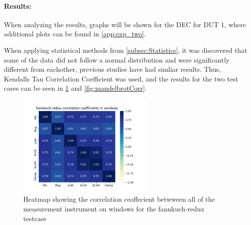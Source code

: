 

\paragraph{Results:} When analyzing the results, graphs will be shown for the DEC for DUT 1, where additional plots can be found in \cref{app:exp_two}.




When applying statistical methods from \cref{subsec:Statistics}, it was discovered that some of the data did not follow a normal distribution and were significantly different from eachother, previous studies \cite{biksbois, Koedijk2022diff} have had simliar results. Thus, Kendalls Tau Correlation Coefficient was used, and the results for the two test cases can be seen in \cref{fig:fannkuchCorr} and \cref{fig:mandelbrotCorr}.

\begin{figure}[H]
    \centering
    \hspace*{-1cm} %
    \includegraphics[width=0.6\textwidth]{figures/Fannkuch-redux_ex2.png}
    \caption{Heatmap showing the correlation ceoffecient betwween all of the measurement instrument on windows for the fannkuch-redux testcase}
    \label{fig:fannkuchCorr}
  \end{figure}
  
